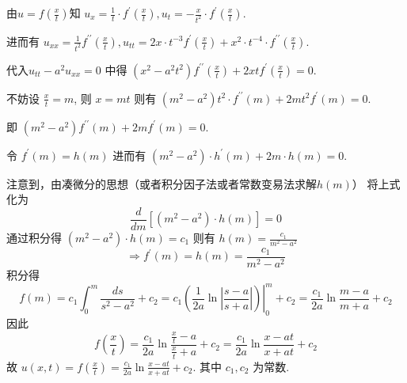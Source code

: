 \begin{questions}
\begin{solution}
由$u=f\left(\frac{x}{t}\right) $知
$ u_{x}=\frac{1}{t} \cdot f^{\prime}\left(\frac{x}{t}\right), u_{t}=-\frac{x}{t^{2}} \cdot f^{\prime}\left(\frac{x}{t}\right)$. 

进而有 $ u_{x x}=\frac{1}{t^{2}} f^{\prime \prime}\left(\frac{x}{t}\right), u_{t t}=2 x \cdot t^{-3} f^{\prime}\left(\frac{x}{t}\right)+x^{2} \cdot t^{-4} \cdot f^{\prime \prime}\left(\frac{x}{t}\right) $.

代入$ u_{t t}-a^{2} u_{x x}=0$  中得 $\left(x^{2}-a^{2} t^{2}\right) f^{\prime \prime}\left(\frac{x}{t}\right)+2 x t f^{\prime}\left(\frac{x}{t}\right)=0 \text {. }$

不妨设 $ \frac{x}{t}=m $, 则 $ x=m t $
则有 $ \left(m^{2}-a^{2}\right) t^{2} \cdot f^{\prime \prime}(m)+2 m t^{2} f^{\prime}(m)=0 $.

即 $ \left(m^{2}-a^{2}\right) f^{\prime \prime}(m)+2 m f^{\prime}(m)=0 $.

令 $ f^{\prime}(m)=h(m) $
进而有 $ \left(m^{2}-a^{2}\right) \cdot h^{\prime}(m)+2 m \cdot h(m)=0 $.

注意到，由凑微分的思想（或者积分因子法或者常数变易法求解$h(m)$）
将上式化为 $$ \frac{d}{d m}\left[\left(m^{2}-a^{2}\right) \cdot h(m)\right]=0 $$
通过积分得 $ \left(m^{2}-a^{2}\right) \cdot h(m)=c_{1} $
则有 $ h(m)=\frac{c_{1}}{m^{2}-a^{2}} $
$$
\Longrightarrow f^{\prime}(m)=h(m)  =\frac{c_{1}}{m^{2}-a^{2}} $$
 积分得 
$$f(m)  =c_{1} \int_{0}^{m} \frac{d s}{s^{2}-a^{2}}+c_{2}  =\left.c_{1}\left(\frac{1}{2 a} \ln \left|\frac{s-a}{s+a}\right|\right)\right|_{0} ^{m}+c_{2} 
=\frac{c_1}{2 a} \ln \frac{m-a}{m+a}+c_{2}$$
因此 $$ f\left(\frac{x}{t}\right)=\frac{c_{1}}{2 a} \ln {\frac{\frac{x}{t}-a}{\frac{x}{t}+a}}+c_{2} 
=\frac{c_{1}}{2 a} \ln \frac{x-a t}{x+a t}+c_{2}
$$
故 $ u(x, t)=f\left(\frac{x}{t}\right)=\frac{c_{1}}{2 a} \ln \frac{x-a t}{x+a t}+c_{2} $. 其中 $c_1,c_2$ 为常数.
\end{solution}
\begin{solution}


\end{solution}
\end{questions}
